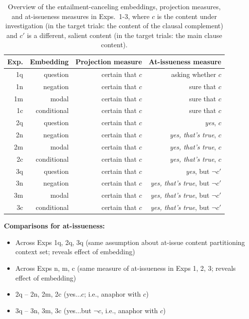 \documentclass[11pt,fleqn]{article}
\newcommand{\6}{\mbox{$[\hspace*{-.6mm}[$}}
\newcommand{\9}{\mbox{$]\hspace*{-.6mm}]$}}
\begin{document}
\begin{table}[h!]
\centering
\begin{tabular}{r | r | r | r}

{\bf Exp.} & {\bf Embedding} & {\bf Projection measure} & {\bf At-issueness measure} \\ 
\hline
1q & question & certain that $c$ & asking whether $c$ \\
1n & negation & certain that $c$ & sure that $c$ \\
1m & modal & certain that $c$ & sure that $c$ \\
1c & conditional & certain that $c$ & sure that $c$ \\
\hline
2q & question & certain that $c$ & {\em yes}, $c$ \\ 
2n & negation & certain that $c$& {\em yes, that's true}, $c$ \\ 
2m & modal & certain that $c$& {\em yes, that's true}, $c$ \\ 
2c & conditional & certain that $c$& {\em yes, that's true}, $c$ \\ 
\hline
3q & question & certain that $c$& {\em yes}, but $\neg c'$ \\ 
3n & negation & certain that $c$& {\em yes, that's true}, but $\neg c'$ \\ 
3m & modal & certain that $c$& {\em yes, that's true}, but $\neg c'$ \\ 
3c & conditional & certain that $c$& {\em yes, that's true}, but $\neg c'$ \\ 
\hline
\end{tabular}
\caption{Overview of the entailment-canceling embeddings, projection measures, and at-issueness measures in Exps.~1-3, where $c$ is the content under investigation (in the target trials: the content of the clausal complement) and $c'$ is a different, salient content (in the target trials: the main clause content).}\label{t-overview}
\end{table}

{\bf Comparisons for at-issueness:}

\begin{itemize}

\item Across Exps 1q, 2q, 3q (same assumption about at-issue content partitioning context set; reveals effect of embedding)

\item Across Exps n, m, c (same measure of at-issueness in Exps 1, 2, 3; reveals effect of embedding)

\item 2q -- 2n, 2m, 2c (yes...$c$; i.e., anaphor with $c$)

\item 3q -- 3n, 3m, 3c (yes...but $\neg c$, i.e., anaphor with $c$)


\end{itemize}
\end{document}
